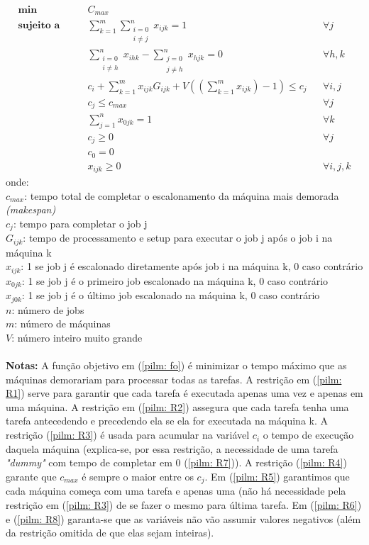 \documentclass[10pt]{scrartcl}
\begin{document}
\begin{align}
  \textbf{min} \qquad & C_{max} \label{pilm: fo}\\ 
  \textbf{sujeito a}\qquad
  & \sum_{k=1}^{m} \sum_{\substack{i=0 \\ i\neq j}}^{n} x_{ijk} = 1 &&\forall j \label{pilm: R1}\\
  & \sum_{\substack{i=0 \\ i\neq h}}^{n}x_{ihk} - \sum_{\substack{j=0 \\ j\neq h}}^{n}x_{hjk} = 0 && \forall h,k \label{pilm: R2}\\
  & c_i + \sum_{k=1}^{m}x_{ijk} G_{ijk} + V ( (\sum_{k=1}^{m}x_{ijk}) - 1) \leq c_j && \forall i,j \label{pilm: R3}\\
  & c_j \leq c_{max} && \forall j \label{pilm: R4}\\
  & \sum_{j=1}^{n}x_{0jk} = 1 && \forall k  \label{pilm: R5}\\
  & c_j \geq 0 && \forall j \label{pilm: R6}\\
  & c_0 = 0 \label{pilm: R7}\\
  & x_{ijk} \geq 0 && \forall i,j,k \label{pilm: R8} 
\end{align}
onde:\\
$c_{max}$: tempo total de completar o escalonamento da máquina mais demorada \textit{(makespan)} \\
$c_j$: tempo para completar o job j\\
$G_{ijk}$: tempo de processamento e setup para executar o job j após o job i na máquina k \\
$x_{ijk}$: 1 se job j é escalonado diretamente após job i na máquina k, 0 caso contrário \\
$x_{0jk}$: 1 se job j é o primeiro job escalonado na máquina k, 0 caso contrário \\
$x_{j0k}$: 1 se job j é o último job escalonado na máquina k, 0 caso contrário \\
$n$: número de jobs \\
$m$: número de máquinas \\
$V$: número inteiro muito grande \\ \\
\textbf{Notas:} A função objetivo em (\ref{pilm: fo}) é minimizar o tempo máximo que as máquinas demorariam para processar todas as tarefas. A restrição em (\ref{pilm: R1}) serve para garantir que cada tarefa é executada apenas uma vez e apenas em uma máquina. A restrição em (\ref{pilm: R2}) assegura que cada tarefa tenha uma tarefa antecedendo e precedendo ela se ela for executada na máquina k. A restrição (\ref{pilm: R3}) é usada para acumular na variável $c_i$ o tempo de execução daquela máquina (explica-se, por essa restrição, a necessidade de uma tarefa \textit{"dummy"} com tempo de completar em 0 (\ref{pilm: R7})). A restrição (\ref{pilm: R4}) garante que $c_{max}$ é sempre o maior entre os $c_j$. Em (\ref{pilm: R5}) garantimos que cada máquina começa com uma tarefa e apenas uma (não há necessidade pela restrição em (\ref{pilm: R3}) de se fazer o mesmo para última tarefa. Em (\ref{pilm: R6}) e (\ref{pilm: R8}) garanta-se que as variáveis não vão assumir valores negativos (além da restrição omitida de que elas sejam inteiras).\\
\end{document}
